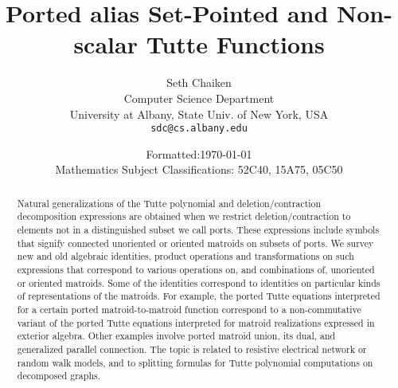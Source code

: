 \documentclass[12pt]{article}
\title{Ported alias Set-Pointed and Non-scalar Tutte Functions}
\author{Seth Chaiken\\
\small Computer Science Department\\[-0.8ex]
\small University at Albany, State Univ. of New York, USA\\[-0.8ex]
\small \texttt{sdc@cs.albany.edu}
}
\date{
Formatted:\today\\
\small Mathematics Subject Classifications: 52C40, 15A75, 05C50}
\begin{document}
\maketitle

\begin{abstract}
Natural generalizations of the Tutte polynomial and deletion/contraction
decomposition expressions are obtained when we restrict deletion/contraction
to elements not in a distinguished subset we call ports.  These expressions
include symbols that signify connected unoriented or oriented matroids on 
subsets of ports.  We survey new and old algebraic identities, product
operations and transformations on such expressions that correspond to
various operations on, and combinations of, unoriented or oriented matroids.
Some of the identities correspond to identities on particular kinds of
representations of the matroids.  For example, the ported Tutte equations 
interpreted for a certain ported matroid-to-matroid function correspond 
to a non-commutative variant of the ported Tutte equations 
interpreted for matroid realizations expressed in exterior algebra.  
Other examples involve ported matroid union,
its dual, and generalized parallel connection.  The topic is related
to resistive electrical network or random walk models, and to splitting 
formulas for Tutte polynomial computations on decomposed graphs.
\end{abstract}
\end{document}
